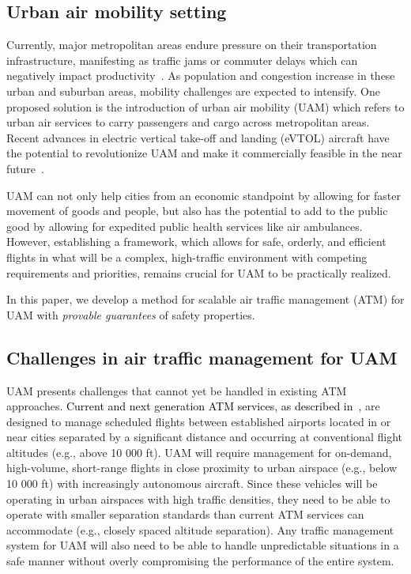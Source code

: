 \subsection{Urban air mobility setting}

Currently, major metropolitan areas endure pressure on their transportation infrastructure, manifesting as traffic jams or commuter delays which can negatively impact productivity~\cite{harriet2013assessment}.  As population and congestion increase in these urban and suburban areas, mobility challenges are expected to intensify. One proposed solution is the introduction of urban air mobility (UAM) which refers to urban  air  services  to  carry  passengers  and  cargo across  metropolitan  areas.
Recent advances in electric vertical take-off and landing (eVTOL) aircraft have the potential to revolutionize UAM and make it commercially feasible in the near future~\cite{flightplan2030}. 

UAM can not only help cities from an economic standpoint by allowing for faster movement of goods and people, but also has the potential to add to the public good by allowing for expedited public health services like air ambulances. However, establishing a framework, which allows for safe, orderly, and efficient flights in what will be a complex, high-traffic environment with competing requirements and priorities, remains crucial for UAM to be practically realized. 

In this paper, we develop a method for scalable air traffic management (ATM) for UAM with \emph{provable guarantees} of safety properties. 

\subsection{Challenges in air traffic management for UAM}

UAM presents challenges that cannot yet be handled in existing ATM approaches. \textcolor{black}{Current and next generation ATM services, as described in~\cite{cook2007european,swenson2006next},} are designed to manage scheduled flights between established airports located in or near cities separated by a significant distance and occurring at conventional flight altitudes (e.g., above 10 000 ft). UAM will require management for on-demand, high-volume, short-range flights in close proximity to urban airspace (e.g., below 10 000 ft) with increasingly autonomous aircraft. Since these vehicles will be operating in urban airspaces with high traffic densities, they need to be able to operate with smaller separation standards than current ATM services can accommodate (e.g., closely spaced altitude separation). Any traffic management system for UAM will also need to be able to handle unpredictable situations in a safe manner without overly compromising the performance of the entire system. 

